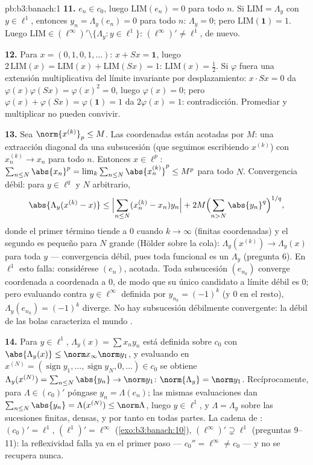 \begin{solution}{pb:b3:banach:1}
\textbf{11.} $e_n \in c_0$, luego $\mathrm{LIM}(e_n) = 0$ para todo $n$.
Si $\mathrm{LIM} = \Lambda_y$ con $y \in \ell^1$, entonces
$y_n = \Lambda_y(e_n) = 0$ para todo $n$: $\Lambda_y = 0$; pero
$\mathrm{LIM}(\mathbf 1) = 1$. Luego $\mathrm{LIM} \in
(\ell^\infty)' \setminus \{\Lambda_y : y \in \ell^1\}$:
$(\ell^\infty)' \neq \ell^1$, de nuevo.

\textbf{12.} Para $x = (0,1,0,1,\dots)$: $x + Sx = \mathbf 1$, luego
$2\,\mathrm{LIM}(x) = \mathrm{LIM}(x) + \mathrm{LIM}(Sx) =
1$: $\mathrm{LIM}(x) = \frac12$. Si $\varphi$ fuera una extensión
multiplicativa del límite invariante por desplazamiento: $x\cdot
Sx = 0$ da $\varphi(x)\varphi(Sx) = \varphi(x)^2 = 0$, luego
$\varphi(x) = 0$; pero $\varphi(x) + \varphi(Sx) =
\varphi(\mathbf 1) = 1$ da $2\varphi(x) = 1$: contradicción. Promediar y
multiplicar no pueden convivir.

\textbf{13.} Sea $\norm{x^{(k)}}_p \leq M$. Las coordenadas están
acotadas por $M$: una extracción diagonal da una subsucesión (que
seguimos escribiendo $x^{(k)}$) con $x^{(k)}_n \to x_n$ para todo $n$.
Entonces $x \in \ell^p$: $\sum_{n\leq N}\abs{x_n}^p =
\lim_k\sum_{n\leq N}\abs{x^{(k)}_n}^p \leq M^p$ para todo $N$.
Convergencia débil: para $y \in \ell^q$ y $N$ arbitrario,
\[
\abs{\Lambda_y(x^{(k)} - x)} \leq
\Bigl|\sum_{n \leq N}(x^{(k)}_n - x_n)y_n\Bigr|
+ 2M\Bigl(\sum_{n>N}\abs{y_n}^q\Bigr)^{1/q},
\]
donde el primer término tiende a $0$ cuando $k \to \infty$ (finitas
coordenadas) y el segundo es pequeño para $N$ grande (Hölder sobre la
cola): $\Lambda_y(x^{(k)}) \to \Lambda_y(x)$ para toda $y$ ---
convergencia débil, pues toda funcional es un $\Lambda_y$ (pregunta 6).
En $\ell^1$ esto falla: considérese $(e_n)$, acotada. Toda subsucesión
$(e_{n_k})$ converge coordenada a coordenada a $0$, de modo que su único
candidato a límite débil es $0$; pero evaluando contra
$y \in \ell^\infty$ definida por $y_{n_k} =
(-1)^k$ (y $0$ en el resto), $\Lambda_y(e_{n_k}) = (-1)^k$ diverge. No
hay subsucesión débilmente convergente: la
 débil de
las bolas caracteriza el mundo .

\textbf{14.} Para $y \in \ell^1$, $\Lambda_y(x) = \sum x_ny_n$ está
definida sobre $c_0$ con $\abs{\Lambda_y(x)} \leq \norm
x_\infty\norm y_1$, y evaluando en $x^{(N)} =
(\operatorname{sign}y_1, \dots, \operatorname{sign}y_N, 0,
\dots) \in c_0$ se obtiene $\Lambda_y(x^{(N)}) =
\sum_{n\leq N}\abs{y_n} \to \norm y_1$: $\norm{\Lambda_y} = \norm y_1$.
Recíprocamente, para $\Lambda \in
(c_0)'$ póngase $y_n = \Lambda(e_n)$; las mismas evaluaciones dan
$\sum_{n \leq N}\abs{y_n} = \Lambda(x^{(N)}) \leq
\norm\Lambda$, luego $y \in \ell^1$, y $\Lambda = \Lambda_y$ sobre las
sucesiones finitas, densas, y por tanto en todas partes. La cadena de
: $(c_0)' = \ell^1$,
$(\ell^1)' = \ell^\infty$
(\cref{exo:b3:banach:10}), $(\ell^\infty)' \supsetneq \ell^1$
(preguntas 9--11): la reflexividad falla ya en el primer paso ---
$c_0'' = \ell^\infty \neq c_0$ --- y no se recupera nunca.


\end{solution}
